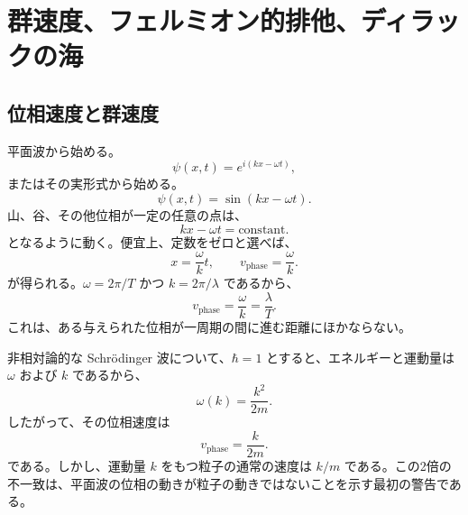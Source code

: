 \chapter{群速度、フェルミオン的排他、ディラックの海}

\section{位相速度と群速度}

\begin{classroomqa}
\end{classroomqa}

平面波から始める。
\begin{equation}
\psi(x,t)=e^{i(kx-\omega t)},
\end{equation}
またはその実形式から始める。
\begin{equation}
\psi(x,t)=\sin(kx-\omega t).
\end{equation}
山、谷、その他位相が一定の任意の点は、
\begin{equation}
kx-\omega t=\text{constant}.
\end{equation}
となるように動く。便宜上、定数をゼロと選べば、
\begin{equation}
x=\frac{\omega}{k}t,
\qquad
v_{\mathrm{phase}}=\frac{\omega}{k}.
\end{equation}
が得られる。\(\omega=2\pi/T\) かつ \(k=2\pi/\lambda\) であるから、
\begin{equation}
v_{\mathrm{phase}}=\frac{\omega}{k}=\frac{\lambda}{T}.
\end{equation}
これは、ある与えられた位相が一周期の間に進む距離にほかならない。

非相対論的な Schr\"odinger 波について、\(\hbar=1\) とすると、エネルギーと運動量は \(\omega\) および \(k\) であるから、
\begin{equation}
\omega(k)=\frac{k^2}{2m}.
\end{equation}
したがって、その位相速度は
\begin{equation}
v_{\mathrm{phase}}=\frac{k}{2m}.
\end{equation}
である。しかし、運動量 \(k\) をもつ粒子の通常の速度は \(k/m\) である。この2倍の不一致は、平面波の位相の動きが粒子の動きではないことを示す最初の警告である。

